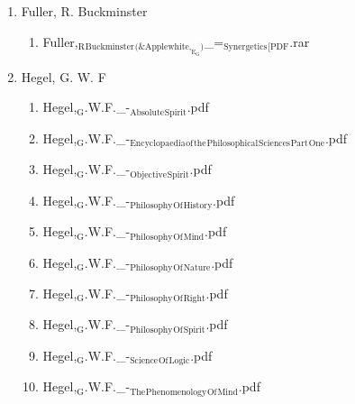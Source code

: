 \documentclass[11pt]{article}
\begin{document}
\begin{enumerate}
\begin{enumerate}
\begin{enumerate}
\begin{enumerate}
\begin{enumerate}
\item Fuller, R. Buckminster
\label{sec-1-1-1-1-7-3-14-35}
\begin{enumerate}
\item Fuller,$_{\text{R}}$$_{\text{Buckminster}}$$_{\text{(\& Applewhite,}_{\text{E}}_{\text{G}}\text{)}}$\_=$_{\text{Synergetics}}$$_{\text{[PDF}}$.rar
\label{sec-1-1-1-1-7-3-14-35-1}
\end{enumerate}

\item Hegel, G. W. F
\label{sec-1-1-1-1-7-3-14-36}
\begin{enumerate}
\item Hegel,$_{\text{G}}$.W.F.\_-$_{\text{Absolute}}$$_{\text{Spirit}}$.pdf
\label{sec-1-1-1-1-7-3-14-36-1}

\item Hegel,$_{\text{G}}$.W.F.\_-$_{\text{Encyclopaedia}}$$_{\text{of}}$$_{\text{the}}$$_{\text{Philosophical}}$$_{\text{Sciences}}$$_{\text{Part}}$$_{\text{One}}$.pdf
\label{sec-1-1-1-1-7-3-14-36-2}

\item Hegel,$_{\text{G}}$.W.F.\_-$_{\text{Objective}}$$_{\text{Spirit}}$.pdf
\label{sec-1-1-1-1-7-3-14-36-3}

\item Hegel,$_{\text{G}}$.W.F.\_-$_{\text{Philosophy}}$$_{\text{Of}}$$_{\text{History}}$.pdf
\label{sec-1-1-1-1-7-3-14-36-4}

\item Hegel,$_{\text{G}}$.W.F.\_-$_{\text{Philosophy}}$$_{\text{Of}}$$_{\text{Mind}}$.pdf
\label{sec-1-1-1-1-7-3-14-36-5}

\item Hegel,$_{\text{G}}$.W.F.\_-$_{\text{Philosophy}}$$_{\text{Of}}$$_{\text{Nature}}$.pdf
\label{sec-1-1-1-1-7-3-14-36-6}

\item Hegel,$_{\text{G}}$.W.F.\_-$_{\text{Philosophy}}$$_{\text{Of}}$$_{\text{Right}}$.pdf
\label{sec-1-1-1-1-7-3-14-36-7}

\item Hegel,$_{\text{G}}$.W.F.\_-$_{\text{Philosophy}}$$_{\text{Of}}$$_{\text{Spirit}}$.pdf
\label{sec-1-1-1-1-7-3-14-36-8}

\item Hegel,$_{\text{G}}$.W.F.\_-$_{\text{Science}}$$_{\text{Of}}$$_{\text{Logic}}$.pdf
\label{sec-1-1-1-1-7-3-14-36-9}

\item Hegel,$_{\text{G}}$.W.F.\_-$_{\text{The}}$$_{\text{Phenomenology}}$$_{\text{Of}}$$_{\text{Mind}}$.pdf
\label{sec-1-1-1-1-7-3-14-36-10}
\end{enumerate}


\end{enumerate}
\end{enumerate}
\end{enumerate}
\end{enumerate}
\end{enumerate}
\end{document}
